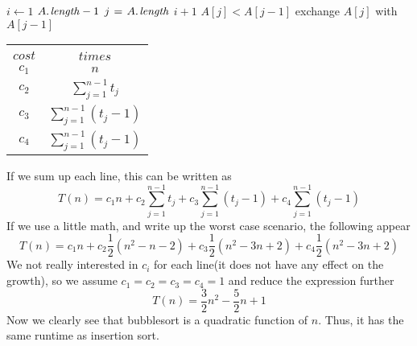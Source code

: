 \documentclass[11pt,a4paper]{article}
\begin{document}
\begin{itemize}
        \begin{multicols}{3}

    \begin{minipage}{0.40\textwidth}
    \begin{codebox}
    \li \For $i \gets 1$ \To $\attrib{A}{length} - 1$ \Do
    \li     \For $j \gets \attrib{A}{length}$ \Downto $i + 1$ \Do
    \li         \If $A[j] < A[j - 1]$ \Then
    \li             exchange $A[j]$ with $A[j - 1]$ 
                    \End
    \end{codebox}
    \end{minipage}

    \columnbreak
    \hspace{0.4\textwidth}
    \columnbreak

    \begin{minipage}{0.2\textwidth}
        \begin{tabular}{ c c }
            \multicolumn{1}{c}{} \\
            $cost$  & $times$ \\
            $c_{1}$ & $n$ \\
            $c_{2}$ & $\sum_{j=1}^{n-1}t_{j}$ \\
            $c_{3}$ & $\sum_{j=1}^{n-1}(t_{j}-1)$ \\
            $c_{4}$ & $\sum_{j=1}^{n-1}(t_{j}-1)$ \\
        \end{tabular}
    \end{minipage}
   
\end{multicols}
If we sum up each line, this can be written as
$$ T(n)=c_{1}n+c_{2}\sum_{j=1}^{n-1}t_{j}+c_{3}\sum_{j=1}^{n-1}(t_{j}-1)+c_{4}\sum_{j=1}^{n-1}(t_{j}-1)$$
If we use a little math, and write up the worst case scenario, the following appear
$$T(n) = c_{1}n + c_{2} \frac{1}{2} (n^2-n-2)+c_{3}\frac{1}{2}(n^2-3 n+2)+c_{4}\frac{1}{2} (n^2-3 n+2)$$
We not really interested in $c_i$ for each line(it does not have any effect on the growth), so we assume $c_1=c_2=c_3=c_4=1$ and reduce the expression further
$$T(n) = \frac{3}{2}n^2-\frac{5}{2}n+1$$
Now we clearly see that bubblesort is a quadratic function of $n$. Thus, it has the same runtime as insertion sort.
\end{itemize}
\end{document}
